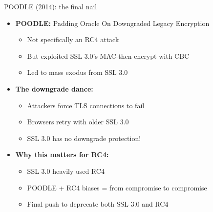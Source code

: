 \documentclass[aspectratio=169, lualatex, handout]{beamer}
\begin{document}
\begin{frame}{POODLE (2014): the final nail}
	\begin{itemize}
		\item \textbf{POODLE:} Padding Oracle On Downgraded Legacy Encryption
		      \begin{itemize}
			      \item Not specifically an RC4 attack
			      \item But exploited SSL 3.0's MAC-then-encrypt with CBC
			      \item Led to mass exodus from SSL 3.0
		      \end{itemize}
		\item \textbf{The downgrade dance:}
		      \begin{itemize}
			      \item Attackers force TLS connections to fail
			      \item Browsers retry with older SSL 3.0
			      \item SSL 3.0 has no downgrade protection!
		      \end{itemize}
		\item \textbf{Why this matters for RC4:}
		      \begin{itemize}
			      \item SSL 3.0 heavily used RC4
			      \item POODLE + RC4 biases = from compromise to compromise
			      \item Final push to deprecate both SSL 3.0 and RC4
		      \end{itemize}
	\end{itemize}
\end{frame}
\end{document}
